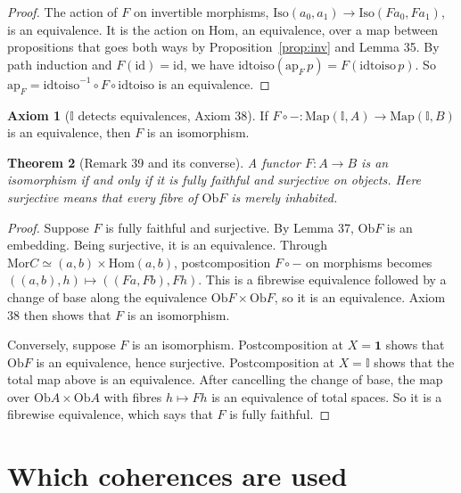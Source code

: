 \documentclass[11pt]{amsart}
\numberwithin{equation}{section}
\newtheorem{theorem}{Theorem}[section]
\theoremstyle{definition}
\newtheorem{axiom}[theorem]{Axiom}
\theoremstyle{remark}
\newcommand{\Map}{\mathrm{Map}}
\newcommand{\Ob}{\mathrm{Ob}}
\newcommand{\Mor}{\mathrm{Mor}}
\newcommand{\Hom}{\mathrm{Hom}}
\newcommand{\Iso}{\mathrm{Iso}}
\newcommand{\id}{\mathrm{id}}
\newcommand{\II}{\mathbb{I}}
\newcommand{\one}{\mathbf{1}}
\begin{document}
\begin{proof}
The action of $F$ on invertible morphisms, $\Iso(a_0,a_1)\to
\Iso(Fa_0,Fa_1)$, is an equivalence. It is the action on $\Hom$, an
equivalence, over a map between propositions that goes both ways by
Proposition~\ref{prop:inv} and Lemma 35. By path induction and
$F(\id)=\id$, we have $\mathrm{idtoiso}(\mathrm{ap}_F\,p)=
F(\mathrm{idtoiso}\,p)$. So
$\mathrm{ap}_F=\mathrm{idtoiso}^{-1}\circ F\circ\mathrm{idtoiso}$ is an
equivalence.
\end{proof}

\begin{axiom}[$\II$ detects equivalences, Axiom 38]
If $F\circ-:\Map(\II,A)\to\Map(\II,B)$ is an equivalence, then $F$ is an
isomorphism.
\end{axiom}

\begin{theorem}[Remark 39 and its converse]
A functor $F:A\to B$ is an isomorphism if and only if it is fully
faithful and surjective on objects. Here surjective means that every
fibre of $\Ob F$ is merely inhabited.
\end{theorem}

\begin{proof}
Suppose $F$ is fully faithful and surjective. By Lemma 37, $\Ob F$ is
an embedding. Being surjective, it is an equivalence. Through
$\Mor C\simeq(a,b)\times\Hom(a,b)$, postcomposition $F\circ-$ on
morphisms becomes $((a,b),h)\mapsto((Fa,Fb),Fh)$. This is a fibrewise
equivalence followed by a change of base along the equivalence
$\Ob F\times\Ob F$, so it is an equivalence. Axiom 38 then shows that
$F$ is an isomorphism.

Conversely, suppose $F$ is an isomorphism. Postcomposition at $X=\one$
shows that $\Ob F$ is an equivalence, hence surjective. Postcomposition
at $X=\II$ shows that the total map above is an equivalence. After
cancelling the change of base, the map over $\Ob A\times\Ob A$ with
fibres $h\mapsto Fh$ is an equivalence of total spaces. So it is a
fibrewise equivalence, which says that $F$ is fully faithful.
\end{proof}

\section{Which coherences are used}\label{sec:levels}
\end{document}

